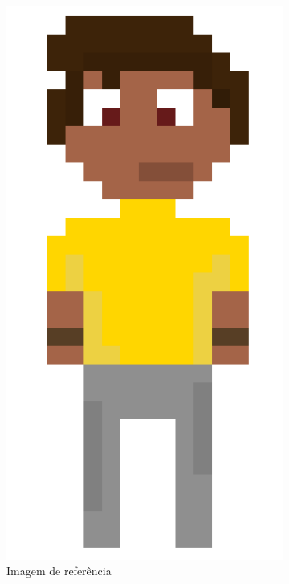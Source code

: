 \begin{figure}[htbp]
    \centering
    \caption{\small Comparação do sprite original com quadros das animações geradas}
    \label{fig:godmodAIComparar}
    \begin{subfigure}{0.21\linewidth}
        \includegraphics[width=0.6\linewidth]{figs/sprites/Pablo.PNG}
        \caption{\small Imagem de referência}
        \label{fig:godmodAIPablo}
    \end{subfigure}
    \begin{subfigure}{0.21\linewidth}

\end{subfigure}
\end{figure}
